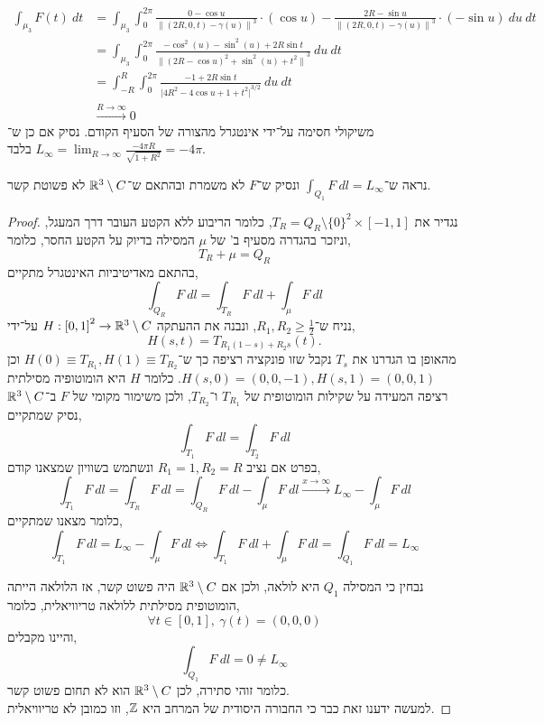 \begin{solution}
	\begin{align*}
		\int_{\mu_3} F(t)\ dt
		& = \int_{\mu_3} \int_{0}^{2 \pi} \frac{0 - \cos u}{{\lVert (2R, 0, t) - \gamma(u) \rVert}^3} \cdot (\cos u) - \frac{2R - \sin u}{{\lVert (2R, 0, t) - \gamma(u) \rVert}^3} \cdot (- \sin u)\ du\ dt \\
		& = \int_{\mu_3} \int_{0}^{2 \pi} \frac{- \cos^2(u) - \sin^2(u) + 2R \sin t}{{\lVert {(2R - \cos u)}^2 + \sin^2(u) + t^2 \rVert}^3}\ du\ dt \\
		& = \int_{-R}^{R} \int_{0}^{2 \pi} \frac{-1 + 2R \sin t}{\lvert {4R^2 - 4 \cos u + 1 + t^2 \rvert}^{3 / 2}}\ du\ dt \\
		& \xrightarrow{R \to \infty} 0
	\end{align*}
	משיקולי חסימה על־ידי אינטגרל מהצורה של הסעיף הקודם.
	נסיק אם כן ש־$L_{\infty} = \lim_{R \to \infty} \frac{-4 \pi R}{\sqrt{1 + R^2}} = -4 \pi$ בלבד.
\end{solution}

\subquestion{}
נראה ש־$\int_{Q_1} F\ dl = L_{\infty}$ ונסיק ש־$F$ לא משמרת ובהתאם ש־$\mathbb{R}^3 \setminus C$ לא פשוטת קשר.
\begin{proof}
	נגדיר את $T_R = Q_R \setminus {\{ 0 \}}^2 \times [-1, 1]$, כלומר הריבוע ללא הקטע העובר דרך המעגל, וניזכר בהגדרה מסעיף ב' של $\mu$ המסילה בדיוק על הקטע החסר, כלומר,
	\[
		T_R + \mu
		= Q_R
	\]
	בהתאם מאדיטיביות האינטגרל מתקיים,
	\[
		\int_{Q_R} F\ dl
		= \int_{T_R} F\ dl + \int_{\mu} F\ dl
	\]
	נניח ש־$R_1, R_2 \ge \frac{1}{2}$, ונבנה את ההעתקה $H : {[0, 1]}^2 \to \mathbb{R}^3 \setminus C$ על־ידי,
	\[
		H(s, t)
		= T_{R_1 (1 - s) + R_2 s}(t)
	.\]
	מהאופן בו הגדרנו את $T_s$ נקבל שזו פונקציה רציפה כך ש־$H(0) \equiv T_{R_1}, H(1) \equiv T_{R_2}$ וכן $H(s, 0) = (0, 0, -1), H(s, 1) = (0, 0, 1)$.
	כלומר $H$ היא הומוטופיה מסילתית רציפה המעידה על שקילות הומוטופית של $T_{R_1}$ ו־$T_{R_2}$, ולכן משימור מקומי של $F$ ב־$\mathbb{R}^3 \setminus C$ נסיק שמתקיים,
	\[
		\int_{T_1} F\ dl
		= \int_{T_2} F\ dl
	\]
	בפרט אם נציב $R_1 = 1, R_2 = R$ ונשתמש בשוויון שמצאנו קודם,
	\[
		\int_{T_1} F\ dl
		= \int_{T_R} F\ dl
		= \int_{Q_R} F\ dl - \int_{\mu} F\ dl
		\xrightarrow{x \to \infty} L_{\infty} - \int_{\mu} F\ dl
	\]
	כלומר מצאנו שמתקיים,
	\[
		\int_{T_1} F\ dl
		= L_{\infty} - \int_{\mu} F\ dl
		\iff
		\int_{T_1} F\ dl + \int_{\mu} F\ dl
		= \int_{Q_1} F\ dl
		= L_{\infty}
	\]

	נבחין כי המסילה $Q_1$ היא לולאה, ולכן אם $\mathbb{R}^3 \setminus C$ היה פשוט קשר, אז הלולאה הייתה הומוטופית מסילתית ללולאה טריוויאלית, כלומר,
	\[
		\forall t \in [0, 1],\ \gamma(t) = (0, 0, 0)
	\]
	והיינו מקבלים,
	\[
		\int_{Q_1} F\ dl
		= 0
		\ne L_{\infty}
	\]
	כלומר זוהי סתירה, לכן $\mathbb{R}^3 \setminus C$ הוא לא תחום פשוט קשר. \\
	למעשה ידענו זאת כבר כי החבורה היסודית של המרחב היא $\mathbb{Z}$, וזו כמובן לא טריוויאלית.
\end{proof}

